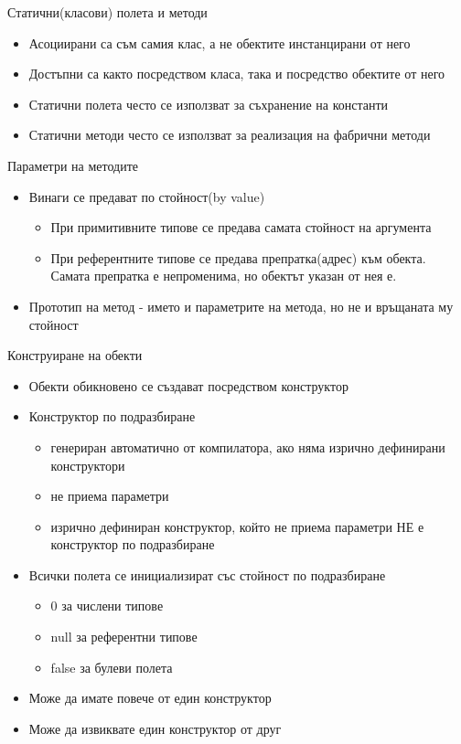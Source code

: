 \documentclass{beamer}
\begin{document}
\begin{frame}{Статични(класови) полета и методи}
  \transdissolve
  \begin{itemize}
  \item Асоциирани са съм самия клас, а не
    обектите инстанцирани от него \pause
  \item Достъпни са както посредством класа,
    така и посредство обектите от него \pause
  \item Статични полета често се използват за
    съхранение на константи \pause
  \item Статични методи често се използват за
    реализация на фабрични методи
  \end{itemize}
\end{frame}

\begin{frame}{Параметри на методите}
  \transdissolve
  \begin{itemize}
  \item Винаги се предават по стойност(by value)
    \begin{itemize}
    \item При примитивните типове се предава самата стойност на
      аргумента
    \item При референтните типове се предава препратка(адрес) към
      обекта. Самата препратка е непроменима, но обектът указан от
      нея е.
    \end{itemize}
  \item Прототип на метод - името и параметрите на метода, но не и
    връщаната му стойност
  \end{itemize}
\end{frame}

\begin{frame}{Конструиране на обекти}
  \transdissolve
  \begin{itemize}
  \item Обекти обикновено се създават посредством конструктор \pause
  \item Конструктор по подразбиране
    \begin{itemize}
      \item генериран автоматично от компилатора, ако няма изрично
        дефинирани конструктори
      \item не приема параметри
      \item изрично дефиниран конструктор, който не приема параметри
        \alert{НЕ} е конструктор по подразбиране
    \end{itemize}
 \pause
  \item Всички полета се инициализират със стойност по подразбиране
    \begin{itemize}
    \item 0 за числени типове
    \item null за референтни типове
    \item false за булеви полета
    \end{itemize} \pause
  \item Може да имате повече от един конструктор \pause
  \item Може да извиквате един конструктор от друг
  \end{itemize}
\end{frame}
\end{document}
